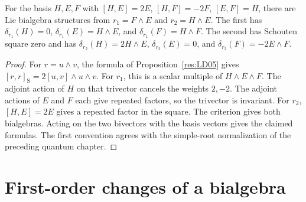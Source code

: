 \begin{example}
\label{res:LD06}
For the basis \(H,E,F\) with \([H,E]=2E\),
\([H,F]=-2F\), \([E,F]=H\), there are Lie bialgebra
structures from \(r_1=F\wedge E\) and \(r_2=H\wedge E\).
The first has
\(\delta_{r_1}(H)=0\), \(\delta_{r_1}(E)=H\wedge E\),
and \(\delta_{r_1}(F)=H\wedge F\).
The second has Schouten square zero and has
\(\delta_{r_2}(H)=2H\wedge E\), \(\delta_{r_2}(E)=0\),
and \(\delta_{r_2}(F)=-2E\wedge F\).
\end{example}
\begin{proof}
For \(r=u\wedge v\), the formula of
Proposition~\ref{res:LD05} gives
\([r,r]_{\mathrm S}=2[u,v]\wedge u\wedge v\).
For \(r_1\), this is a scalar multiple of \(H\wedge E\wedge F\).
The adjoint action of \(H\) on that trivector cancels the
weights \(2,-2\). The adjoint actions of \(E\) and \(F\)
each give repeated factors, so the trivector is invariant.
For \(r_2\), \([H,E]=2E\) gives a repeated factor in the square.
The criterion gives both bialgebras. Acting on the two
bivectors with the basis vectors gives the claimed formulas.
The first convention agrees with the simple-root normalization
of the preceding quantum chapter.
\end{proof}

\section{First-order changes of a bialgebra}

